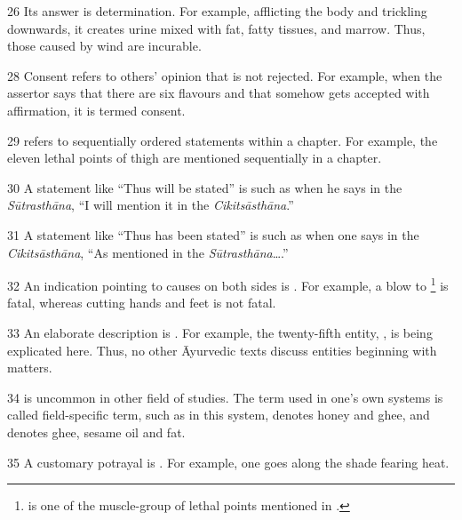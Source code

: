 \begin{translation}
\item [26] Its answer is determination. For example, afflicting the body and 
trickling downwards, it creates urine mixed with fat, fatty tissues, and 
marrow. Thus, those caused by wind are incurable. 

\item [28] Consent refers to others' opinion that is not 
rejected. For example, when the assertor says that there are six flavours and 
that somehow gets accepted with affirmation, it is termed consent.

\item [29]  refers to sequentially ordered statements within a chapter. For example, the eleven lethal points of thigh are mentioned sequentially in a chapter.

\item [30] A statement like “Thus will be stated” is  such as when he says in the \emph{Sūtrasthāna}, “I will mention it in 
the \emph{Cikitsāsthāna}.” 

\item [31] A statement like “Thus has been stated” is 
 such as when one says in the 
\emph{Cikitsāsthāna}, “As mentioned in the \emph{Sūtrasthāna}\ldots.” 

\item [32] An indication pointing to causes on both sides is
. For example, a blow to
\footnote{ is one of the
    muscle-group of lethal points mentioned in .}  is fatal,
    whereas cutting hands and feet is not fatal.

\item [33] An elaborate description is . For example, 
the twenty-fifth entity, , is being explicated here. Thus, no 
other Āyurvedic texts discuss  entities beginning with matters. 

\item [34]  is uncommon in other field of 
studies. The term used in one's own systems is called field-specific term, such as 
in this system,  denotes honey and ghee, and 
 denotes ghee, sesame oil and fat. 

\item [35] A customary potrayal is . For example, one goes along the shade fearing heat. 


\end{translation}
